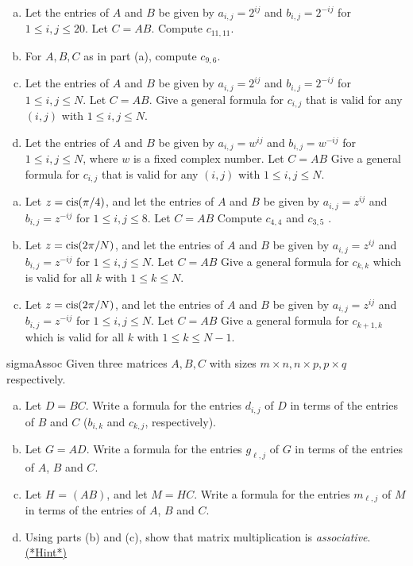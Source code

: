 \begin{exercise}{}
\begin{enumerate}[(a)]
\item
Let the entries of $A$ and $B$ be given by $a_{i,j} =2^{ij}$ and $b_{i,j} =2^{-ij}$ for $1 \le i,j \le 20$. Let $C = AB$.  Compute $c_{11,11}$.
\item
For $A,B,C$ as in part (a), compute $c_{9,6}$. 
\item
Let the entries of $A$ and $B$ be given by $a_{i,j} =2^{ij}$ and $b_{i,j} =2^{-ij}$ for $1 \le i,j \le N$. Let $C = AB$.  Give a general formula for  $c_{i,j}$ that is valid for any $(i,j)$ with $1 \le i,j \le N$.
\item
Let the entries of $A$ and $B$ be given by $a_{i,j} =w^{ij}$ and $b_{i,j} =w^{-ij}$ for $1 \le i,j \le N$, where $w$ is a fixed complex number. Let $C = AB$  Give a general formula for  $c_{i,j}$ that is valid for any $(i,j)$ with $1 \le i,j \le N$.
\end{enumerate}
\end{exercise}

\begin{exercise}{}
\begin{enumerate}[(a)]
\item
Let $z= \operatorname{cis}(\pi/4)$, and let the entries of $A$ and $B$ be given by $a_{i,j} =z^{ij}$ and $b_{i,j} =z^{-ij}$ for $1 \le i,j \le 8$. Let $C = AB$  Compute $c_{4,4}$ and $c_{3,5}$ .
\item
Let $z= \operatorname{cis}(2\pi/N)$, and let the entries of $A$ and $B$ be given by $a_{i,j} =z^{ij}$ and $b_{i,j} =z^{-ij}$ for $1 \le i,j \le N$. Let $C = AB$  Give a general formula for $c_{k,k}$ which is valid for all $k$ with $1 \le k \le N$.
\item
Let $z= \operatorname{cis}(2\pi/N)$, and let the entries of $A$ and $B$ be given by $a_{i,j} =z^{ij}$ and $b_{i,j} =z^{-ij}$ for $1 \le i,j \le N$. Let $C = AB$  Give a general formula for $c_{k+1,k}$ which is valid for all $k$ with $1 \le k \le N-1$.
\end{enumerate}
\end{exercise}

\begin{exercise}{sigmaAssoc}
Given three matrices $A, B, C$ with sizes $m \times n, n \times p, p \times q$ respectively.
\begin{enumerate}[(a)]
\item
Let $D = BC$.  Write a formula for the entries $d_{i,j}$ of $D$ in terms of the entries of $B$ and $C$ ($b_{i,k}$ and $c_{k,j}$, respectively). 
\item
Let $G = AD$.  Write a formula for the entries $g_{\ell,j}$ of $G$ in terms of the entries of $A$, $B$ and $C$.
\item
Let $H$ =  $(AB)$, and let $M = HC$. Write a formula for the entries $m_{\ell,j}$ of $M$ in terms of the entries of $A$, $B$ and $C$.
\item
Using parts (b) and (c), show that matrix multiplication is \emph{associative}. 
\hyperref[sec:SigmaNotation:Hints]{(*Hint*)} 
\end{enumerate}
\end{exercise}

